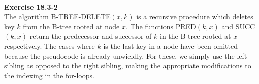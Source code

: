 \documentclass{article}
\begin{document}
\\

\noindent\textbf{Exercise 18.3-2}\\

The algorithm B-TREE-DELETE$(x,k)$ is a recursive procedure which deletes key $k$ from the B-tree rooted at node $x$. The functions PRED$(k,x)$ and SUCC$(k,x)$ return the predecessor and successor of $k$ in the B-tree rooted at $x$ respectively.  The cases where $k$ is the last key in a node have been omitted because the pseudocode is already unwieldly.  For these, we simply use the left sibling as opposed to the right sibling, making the appropriate modifications to the indexing in the for-loops. \\
\end{document}
